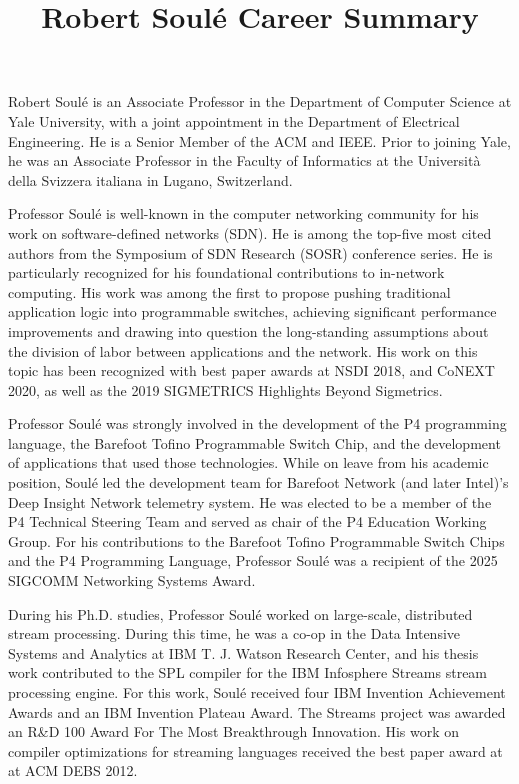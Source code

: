 \documentclass[11pt]{article}
\title{ Robert Soul\'{e} Career Summary}
\author{  }
\date{ }
\begin{document}
\maketitle	
\thispagestyle{empty}


Robert Soul\'{e} is an Associate Professor in the Department of
Computer Science at Yale University, with a joint appointment in the
Department of Electrical Engineering. He is a Senior Member of 
the ACM and IEEE.  Prior to joining Yale, he was an Associate
Professor in the Faculty of Informatics at the Universit\`{a} della
Svizzera italiana in Lugano, Switzerland.



Professor Soul\'{e} is well-known in the computer networking community
for his work on software-defined networks (SDN). He is among the
top-five most cited authors from the Symposium of SDN Research (SOSR)
conference series. He is particularly recognized for his foundational
contributions to in-network computing.  His work was among the first
to propose pushing traditional application logic into programmable
switches, achieving significant performance improvements and drawing
into question the long-standing assumptions about the division of
labor between applications and the network. His work on this topic has
been recognized with best paper awards at NSDI 2018, and CoNEXT 2020,
as well as the 2019 SIGMETRICS Highlights Beyond Sigmetrics.


Professor Soul\'{e} was strongly involved in the development of the P4
programming language, the Barefoot Tofino Programmable Switch Chip,
and the development of applications that used those
technologies. While on leave from his academic position, Soul\'{e} led
the development team for Barefoot Network (and later Intel)'s Deep
Insight Network telemetry system. He was elected to be a member of the
P4 Technical Steering Team and served as chair of the P4 Education
Working Group. For his contributions to the Barefoot Tofino
Programmable Switch Chips and the P4 Programming Language, Professor
Soul\'{e} was a recipient of the 2025 SIGCOMM Networking Systems
Award.


During his Ph.D. studies, Professor Soul\'{e} worked on large-scale,
distributed stream processing. During this time, he was a co-op in the
Data Intensive Systems and Analytics at IBM T. J. Watson Research
Center, and his thesis work contributed to the SPL compiler for the
IBM Infosphere Streams stream processing engine. For this work,
Soul\'{e} received four IBM Invention Achievement Awards and an IBM
Invention Plateau Award. The Streams project was awarded an R\&D 100
Award For The Most Breakthrough Innovation.  His work on compiler
optimizations for streaming languages received the best paper award at
at ACM DEBS 2012.
\end{document}
